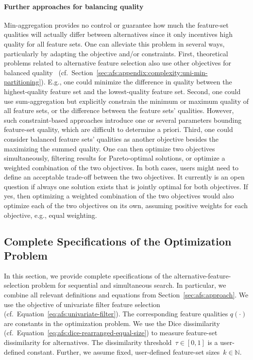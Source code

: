 \documentclass{article}
\theoremstyle{definition}
\begin{document}
\paragraph{Further approaches for balancing quality}

Min-aggregation provides no control or guarantee how much the feature-set qualities will actually differ between alternatives since it only incentives high quality for all feature sets.
One can alleviate this problem in several ways, particularly by adapting the objective and/or constraints.
First, theoretical problems related to alternative feature selection also use other objectives for balanced quality~\cite{korf2010objective, lawrinenko2017identical} (cf.~Section~\ref{sec:afs:appendix:complexity:uni-min-partitioning}).
E.g., one could minimize the difference in quality between the highest-quality feature set and the lowest-quality feature set.
Second, one could use sum-aggregation but explicitly constrain the minimum or maximum quality of all feature sets, or the difference between the feature sets' qualities.
However, such constraint-based approaches introduce one or several parameters bounding feature-set quality, which are difficult to determine a priori.
Third, one could consider balanced feature sets' qualities as another objective besides the maximizing the summed quality.
One can then optimize two objectives simultaneously, filtering results for Pareto-optimal solutions, or optimize a weighted combination of the two objectives.
In both cases, users might need to define an acceptable trade-off between the two objectives.
It currently is an open question if always one solution exists that is jointly optimal for both objectives.
If yes, then optimizing a weighted combination of the two objectives would also optimize each of the two objectives on its own, assuming positive weights for each objective, e.g., equal weighting.

\subsection{Complete Specifications of the Optimization Problem}
\label{sec:afs:appendix:complete-optimization-problem}

In this section, we provide complete specifications of the alternative-feature-selection problem for sequential and simultaneous search.
In particular, we combine all relevant definitions and equations from Section~\ref{sec:afs:approach}.
We use the objective of univariate filter feature selection (cf.~Equation~\ref{eq:afs:univariate-filter}).
The corresponding feature qualities $q(\cdot)$ are constants in the optimization problem.
We use the Dice dissimilarity (cf.~Equation~\ref{eq:afs:dice-rearranged-equal-size}) to measure feature-set dissimilarity for alternatives.
The dissimilarity threshold~$\tau \in [0,1]$ is a user-defined constant.
Further, we assume fixed, user-defined feature-set sizes~$k \in \mathbb{N}$.
\end{document}
